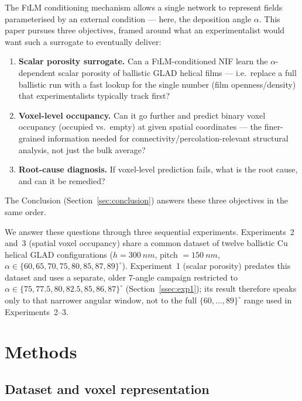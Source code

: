 \documentclass[aip,amsmath,amssymb,reprint]{revtex4-1}
\renewcommand{\ang}{\ensuremath{\alpha}} %
\newcommand{\nif}{\textsc{NIF}}
\newcommand{\film}{\textsc{FiLM}}
\begin{document}
The \film{} conditioning mechanism \citep{perez2018film} allows a
single network to represent fields parameterised by an external
condition — here, the deposition angle $\ang$.
This paper pursues three objectives, framed around what an
experimentalist would want such a surrogate to eventually deliver:
\begin{enumerate}
  \item \textbf{Scalar porosity surrogate.} Can a \film{}-conditioned
    \nif{} learn the $\ang$-dependent scalar porosity of ballistic
    GLAD helical films — i.e.\ replace a full ballistic run with a
    fast lookup for the single number (film openness/density) that
    experimentalists typically track first?
  \item \textbf{Voxel-level occupancy.} Can it go further and predict
    binary voxel occupancy (occupied vs.\ empty) at given spatial
    coordinates — the finer-grained information needed for
    connectivity/percolation-relevant structural analysis, not just
    the bulk average?
  \item \textbf{Root-cause diagnosis.} If voxel-level prediction
    fails, what is the root cause, and can it be remedied?
\end{enumerate}
The Conclusion (Section~\ref{sec:conclusion}) answers these three
objectives in the same order.

We answer these questions through three sequential experiments.
Experiments~2 and~3 (spatial voxel occupancy) share a common
dataset of twelve ballistic Cu helical GLAD configurations
($h = \SI{300}{nm}$, pitch $= \SI{150}{nm}$,
$\ang \in \{60, 65, 70, 75, 80, 85, 87, 89\}^{\circ}$).
Experiment~1 (scalar porosity) predates this dataset and uses a
separate, older 7-angle campaign restricted to
$\ang \in \{75, 77.5, 80, 82.5, 85, 86, 87\}^{\circ}$
(Section~\ref{ssec:exp1}); its result therefore speaks only to
that narrower angular window, not to the full
$\{60,\ldots,89\}^{\circ}$ range used in Experiments~2--3.

\section{Methods}
\label{sec:methods}

\subsection{Dataset and voxel representation}
\label{ssec:data}
\end{document}
